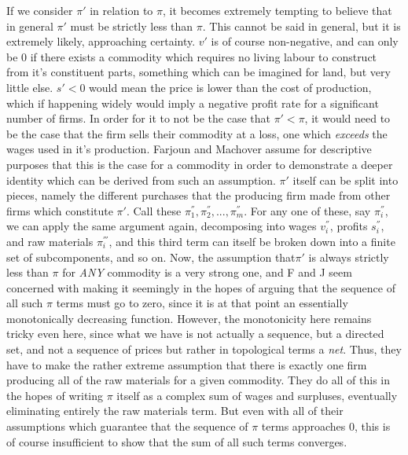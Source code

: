 If we consider $\pi'$ in relation to $\pi$, it becomes extremely tempting to believe that in general $\pi'$ must be strictly less than $\pi$. This cannot be said in general, but it is extremely likely, approaching certainty. $v'$ is of course non-negative, and can only be $0$ if there exists a commodity which requires no living labour to construct from it's constituent parts, something which can be imagined for land, but very little else. $s' < 0$ would mean the price is lower than the cost of production, which if happening widely would imply a negative profit rate for a significant number of firms. In order for it to not be the case that $\pi' < \pi$, it would need to be the case that the firm sells their commodity at a loss, one which \textit{exceeds} the wages used in it's production. Farjoun and Machover assume for descriptive purposes that this is the case for a commodity in order to demonstrate a deeper identity which can be derived from such an assumption. $\pi'$ itself can be split into pieces, namely the different purchases that the producing firm made from other firms which constitute $\pi'$. Call these $\pi^{''}_1,\pi^{''}_2,...,\pi^{''}_{m}$. For any one of these, say $\pi^{''}_i$, we can apply the same argument again, decomposing into wages $v^{''}_i$, profits $s^{''}_i$, and raw materials $\pi^{'''}_i$, and this third term can itself be broken down into a finite set of subcomponents, and so on. Now, the assumption that$\pi'$ is always strictly less than $\pi$ for \textit{ANY} commodity is a very strong one, and F and J seem concerned with making it seemingly in the hopes of arguing that the sequence of all such $\pi$ terms must go to zero, since it is at that point an essentially monotonically decreasing function. However, the monotonicity here remains tricky even here, since what we have is not actually a sequence, but a directed set, and not a sequence of prices but rather in topological terms a \textit{net}. Thus, they have to make the rather extreme assumption that there is exactly one firm producing all of the raw materials for a given commodity. They do all of this in the hopes of writing $\pi$ itself as a complex sum of wages and surpluses, eventually eliminating entirely the raw materials term. But even with all of their assumptions which guarantee that the sequence of $\pi$ terms approaches $0$, this is of course insufficient to show that the sum of all such terms converges. \par 
